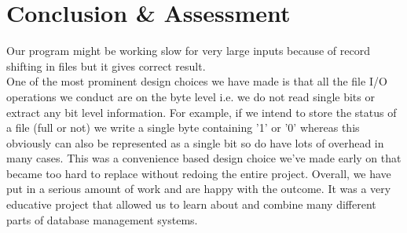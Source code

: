 \documentclass{article}
\begin{document}
\section{Conclusion \& Assessment}
\label{sec:conclusion}
Our program might be working slow for very large inputs because of record shifting in files but it gives correct result. \\
One of the most prominent design choices we have made is that all the file I/O operations we conduct are on the byte level i.e.  we do not read single bits or extract any bit level information.  For example, if we intend to store the status of a file (full or not) we write a single byte containing ’1’ or ’0’ whereas this obviously can also be represented as a single bit so do have lots of overhead in many cases.  This was a convenience based design choice we’ve made early on that became too hard to replace without redoing the entire project. Overall, we have put in a serious amount of work and are happy with the outcome. It was a very educative project that allowed us to learn about and combine many different parts of database management systems.
\end{document}
